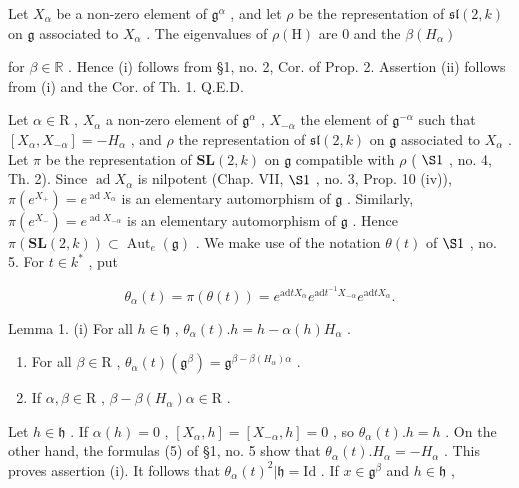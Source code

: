 Let \(X_{\alpha}\) be a non-zero element of \(\mathfrak{g}^{\alpha}\) , and let \(\rho\) be the representation of \(\mathfrak{sl}(2,k)\) on \(\mathfrak{g}\) associated to \(X_{\alpha}\) . The eigenvalues of \(\rho(\mathrm{H})\) are 0 and the \(\beta(H_{\alpha})\)

for \(\beta \in \mathbb{R}\) . Hence (i) follows from §1, no. 2, Cor. of Prop. 2. Assertion (ii) follows from (i) and the Cor. of Th. 1. Q.E.D.

Let \(\alpha \in \mathrm{R}\) , \(X_{\alpha}\) a non-zero element of \(\mathfrak{g}^{\alpha}\) , \(X_{-\alpha}\) the element of \(\mathfrak{g}^{-\alpha}\) such that \([X_{\alpha}, X_{-\alpha}] = -H_{\alpha}\) , and \(\rho\) the representation of \(\mathfrak{sl}(2, k)\) on \(\mathfrak{g}\) associated to \(X_{\alpha}\) . Let \(\pi\) be the representation of \(\mathbf{SL}(2, k)\) on \(\mathfrak{g}\) compatible with \(\rho\) ( \(\S 1\) , no. 4, Th. 2). Since \(\operatorname{ad} X_{\alpha}\) is nilpotent (Chap. VII, \(\S 1\) , no. 3, Prop. 10 (iv)), \(\pi(e^{X_+}) = e^{\operatorname{ad} X_{\alpha}}\) is an elementary automorphism of \(\mathfrak{g}\) . Similarly, \(\pi(e^{X_-}) = e^{\operatorname{ad} X_{-\alpha}}\) is an elementary automorphism of \(\mathfrak{g}\) . Hence \(\pi(\mathbf{SL}(2, k)) \subset \operatorname{Aut}_e(\mathfrak{g})\) . We make use of the notation \(\theta(t)\) of \(\S 1\) , no. 5. For \(t \in k^*\) , put

\[
\theta_ {\alpha} (t) = \pi (\theta (t)) = e ^ {\mathrm{ad} t X _ {\alpha}} e ^ {\mathrm{ad} t ^ {- 1} X _ {- \alpha}} e ^ {\mathrm{ad} t X _ {\alpha}}.\tag{1}
\]

Lemma 1. (i) For all \(h \in \mathfrak{h}\) , \(\theta_{\alpha}(t).h = h - \alpha(h)H_{\alpha}\) .

\begin{enumerate}
\def\labelenumi{(\roman{enumi})}
\setcounter{enumi}{1}
\item
  For all \(\beta \in \mathrm{R}\) , \(\theta_{\alpha}(t)(\mathfrak{g}^{\beta}) = \mathfrak{g}^{\beta - \beta (H_{\alpha})\alpha}\) .
\item
  If \(\alpha, \beta \in \mathrm{R}\) , \(\beta - \beta(H_{\alpha})\alpha \in \mathrm{R}\) .
\end{enumerate}

Let \(h \in \mathfrak{h}\) . If \(\alpha(h) = 0\) , \([X_{\alpha}, h] = [X_{-\alpha}, h] = 0\) , so \(\theta_{\alpha}(t).h = h\) . On the other hand, the formulas (5) of §1, no. 5 show that \(\theta_{\alpha}(t).H_{\alpha} = -H_{\alpha}\) . This proves assertion (i). It follows that \(\theta_{\alpha}(t)^2 | \mathfrak{h} = \mathrm{Id}\) . If \(x \in \mathfrak{g}^{\beta}\) and \(h \in \mathfrak{h}\) ,

